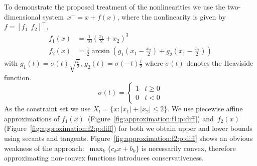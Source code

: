 \documentclass[smallextended]{svjour3}       %
\numberwithin{equation}{section}
\providecommand{\abs}[1]{\left|#1\right|}
\begin{document}
To demonstrate the proposed treatment of the nonlinearities we use the two-dimensional system~$x^+=x+f(x)$, where the nonlinearity is given by $f = [f_1 \ \ f_2]^\top$,
%
\begin{align*}
  f_1(x) &= \frac{1}{10}\left(\frac{x_1}{2}+x_2\right)^3 \\
  f_2(x) &= \frac{1}{2}\arcsin\left(g_1\left(x_1-\frac{x_2}{2}\right)+g_2\left(x_1-\frac{x_2}{2}\right) \right)
\end{align*}
%
with $g_1(t)=\sigma(t)\sqrt{\frac{t}{2}}$, $g_2(t)=\sigma(-t)\frac{t}{2}$ where $\sigma(t)$ denotes the Heaviside function.
\[
  \sigma(t) = \begin{cases} 1 & t \geq 0 \\ 0 & t < 0 \end{cases}
\]
%
As the constraint set we use $X_l = \{x:\abs{x_1}+\abs{x_2}\leq 2\}$.
%
We use piecewise affine approximations of $f_1(x)$~(Figure~\ref{fig:approximation:f1:p:diff}) and~$f_2(x)$ (Figure~\ref{fig:approximation:f2:p:diff})
for both we obtain upper and lower bounds using secants and tangents.
%
Figure~\ref{fig:approximation:f2:p:diff} shows an obvious weakness of the approach:~$\max_k\{c_k x+b_k\}$ is necessarily convex, therefore approximating non-convex functions introduces conservativeness.
\end{document}
